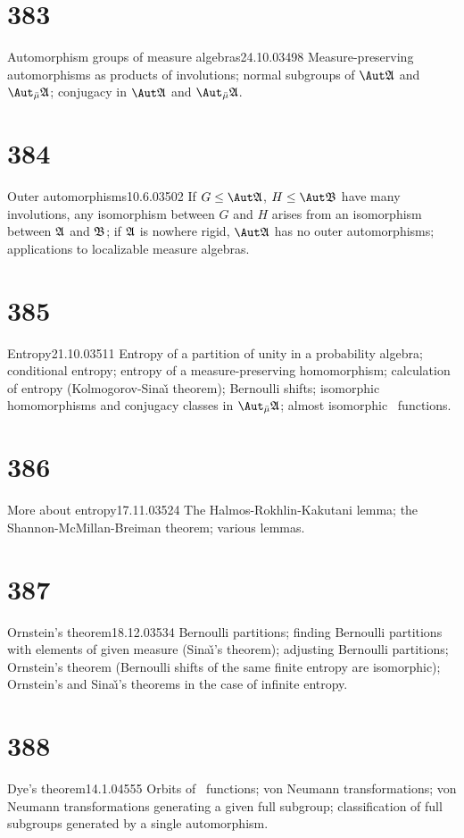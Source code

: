 \section{383}{Automorphism groups of measure algebras}{24.10.03}{498}{}
{Measure-preserving automorphisms as products of involutions;
normal subgroups of $\Aut\frak{A}$ and $\Aut_{\bar\mu}\frak{A}$;
conjugacy in $\Aut\frak{A}$ and $\Aut_{\bar\mu}\frak{A}$.}
     
\section{384}{Outer automorphisms}{10.6.03}{502}{}
{If $G\le\Aut\frak{A}$, $H\le\Aut\frak{B}$ have many involutions,
any isomorphism between $G$ and $H$ arises from an isomorphism between
$\frak{A}$ and $\frak{B}$;  if $\frak{A}$ is nowhere rigid,
$\Aut\frak{A}$
has no outer automorphisms;  applications to localizable measure
algebras.}

\section{385}{Entropy}{21.10.03}{511}{}
{Entropy of a partition of unity in a probability algebra;
conditional entropy;  entropy of a measure-preserving homomorphism;
calculation of entropy (Kolmogorov-Sina\v{\i} theorem);  Bernoulli
shifts;  isomorphic homomorphisms and conjugacy classes in
$\Aut_{\bar\mu}\frak{A}$;  almost isomorphic \imp\ functions.}
     
\section{386}{More about entropy}{17.11.03}{524}{}
{The Halmos-Rokhlin-Kakutani lemma;   
the Shannon-McMillan-Breiman theorem;  various lemmas.}
     
\section{387}{Ornstein's theorem}{18.12.03}{534}{}
{Bernoulli partitions;  finding Bernoulli partitions with elements
of given measure (Sina\v{\i}'s theorem);  adjusting Bernoulli
partitions;
Ornstein's theorem (Bernoulli shifts of the same finite entropy are
isomorphic);  Ornstein's and Sina\v{\i}'s theorems in the case of
infinite entropy.}
     
\section{388}{Dye's theorem}{14.1.04}{555}{}
{Orbits of \imp\ functions;  von Neumann transformations;
von Neumann transformations generating a given full subgroup;
classification of full subgroups generated by a single automorphism.}
     
